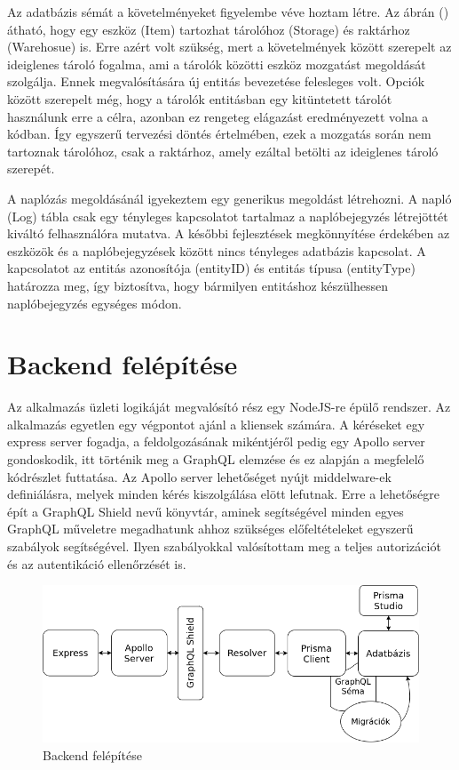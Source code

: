 Az adatbázis sémát a követelményeket figyelembe véve hoztam létre.
Az ábrán () átható, hogy egy eszköz (Item) tartozhat tárolóhoz (Storage) és raktárhoz (Warehosue) is. 
Erre azért volt szükség, mert a követelmények között szerepelt az ideiglenes tároló fogalma, ami a tárolók közötti eszköz mozgatást megoldását szolgálja.
Ennek megvalósítására új entitás bevezetése felesleges volt. Opciók között szerepelt még, hogy a tárolók entitásban egy kitüntetett tárolót használunk erre a célra, azonban ez rengeteg elágazást eredményezett volna a kódban.
Így egyszerű tervezési döntés értelmében, ezek a mozgatás során nem tartoznak tárolóhoz, csak a raktárhoz, amely ezáltal betölti az ideiglenes tároló szerepét.

A naplózás megoldásánál igyekeztem egy generikus megoldást létrehozni.
A napló (Log) tábla csak egy tényleges kapcsolatot tartalmaz a naplóbejegyzés létrejöttét kiváltó felhasználóra mutatva.
A későbbi fejlesztések megkönnyítése érdekében az eszközök és a naplóbejegyzések között nincs tényleges adatbázis kapcsolat.
A kapcsolatot az entitás azonosítója (entityID) és entitás típusa (entityType) határozza meg, így biztosítva, hogy bármilyen entitáshoz készülhessen naplóbejegyzés egységes módon.

\section{Backend felépítése}
Az alkalmazás üzleti logikáját megvalósító rész egy NodeJS-re épülő rendszer.
Az alkalmazás egyetlen egy végpontot ajánl a kliensek számára.
A kéréseket egy express server fogadja, a feldolgozásának mikéntjéről pedig egy Apollo server gondoskodik, itt történik meg a GraphQL elemzése és ez alapján a megfelelő kódrészlet futtatása.
Az Apollo server lehetőséget nyújt middelware-ek definiálásra, melyek minden kérés kiszolgálása elött lefutnak.
Erre a lehetőségre épít a GraphQL Shield nevű könyvtár, aminek segítségével minden egyes GraphQL műveletre megadhatunk ahhoz szükséges előfeltételeket egyszerű szabályok segítségével.
Ilyen szabályokkal valósítottam meg a teljes autorizációt és az autentikáció ellenőrzését is.

\begin{figure}[!ht]
  \centering
  \includegraphics[width=150mm, keepaspectratio]{figures/backend.png}
  \caption{Backend felépítése}
  \label{fig:backend}
\end{figure}

